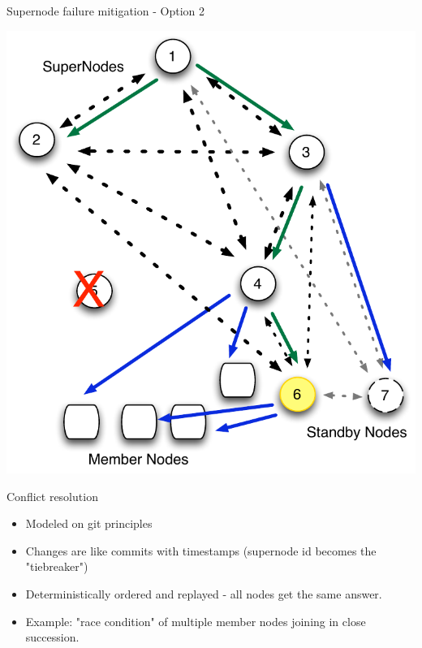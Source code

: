 \documentclass{beamer}
\begin{document}
\begin{frame}{Supernode failure mitigation - Option 2}

\includegraphics[scale=.5]{Node-comm-redist2.pdf}


\end{frame}


%
%
%




\begin{frame}{Conflict resolution}
\begin{itemize}
\item
Modeled on git principles
\item
Changes are like commits with timestamps (supernode id becomes the "tiebreaker")
\item 
Deterministically ordered and replayed - all nodes get the same answer.
\item
Example: "race condition" of multiple member nodes joining in close succession. 

\end{itemize}



\end{frame}
\end{document}
